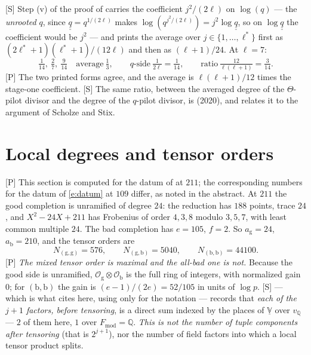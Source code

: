 \documentclass[11pt]{article}
\theoremstyle{plain}
\theoremstyle{definition}
\newcommand{\Fmod}{F_{\mathrm{mod}}}
\newcommand{\qbb}{\underline{\underline q}}
\newcommand{\VVu}{\underline{\mathbb V}}
\begin{document}
\textup{[S]} Step (v) of the proof of \cite[Thm.~1.10]{IUT4} carries the coefficient
$j^2/(2\ell)$ on $\log(q)$ --- the \emph{unrooted} $q$, since
$\qbb=q^{1/(2\ell)}$ makes $\log(q^{j^2/(2\ell)})=j^2\log\qbb$, so on $\log\qbb$ the
coefficient would be $j^2$ --- and prints the average over
$j\in\{1,\dots,\ell^{*}\}$ first as $(2\ell^{*}+1)(\ell^{*}+1)/(12\ell)$ and then as
$(\ell+1)/24$.  At $\ell=7$:
\[
 \tfrac1{14},\ \tfrac27,\ \tfrac9{14}\quad\text{average}\ \tfrac13,
 \qquad\text{$q$-side}\ \tfrac1{2\ell}=\tfrac1{14},
 \qquad\text{ratio}\ \tfrac{12}{\ell(\ell+1)}=\tfrac3{14}.
\]
\textup{[P]} The two printed forms agree, and the average is $\ell(\ell+1)/12$ times
the stage-one coefficient.  \textup{[S]} The same ratio, between the averaged degree of
the $\Theta$-pilot divisor and the degree of the $q$-pilot divisor, is
\cite[\S3.8, (3.3)]{DHPS} (2020), and \cite[Rem.~3.8.3(1)]{DHPS} relates it to the
argument of Scholze and Stix.

\section{Local degrees and tensor orders}\label{s:orders}

\textup{[P]} This section is computed for the datum of \cite{First} at $211$; the
corresponding numbers for the datum of \eqref{e:datum} at $109$ differ, as noted in the
abstract.  At $211$ the good completion is unramified of degree $24$: the reduction
has $188$ points, trace $24$, and $X^2-24X+211$ has Frobenius of order $4,3,8$ modulo
$3,5,7$, with least common multiple $24$.  The bad completion has $e=105$, $f=2$.  So
$a_{\mathrm g}=24$, $a_{\mathrm b}=210$, and the tensor orders are
\[
 N_{(\mathrm g,\mathrm g)}=576,\qquad N_{(\mathrm g,\mathrm b)}=5040,
 \qquad N_{(\mathrm b,\mathrm b)}=44100 .
\]
\textup{[P]} \emph{The mixed tensor order is maximal and the all-bad one is not.}
Because the good side is unramified, $\mathcal O_{\mathrm g}\otimes\mathcal O_{\mathrm b}$
is the full ring of integers, with normalized gain $0$; for $(\mathrm b,\mathrm b)$ the
gain is $(e-1)/(2e)=52/105$ in units of $\log p$.  \textup{[S]}
\cite[Prop.~3.2]{IUT3} --- which is what \cite[Thm.~1.10]{IUT4} cites here, using
\cite[Thm.~3.11(i)(a)]{IUT3} only for the notation --- records that \emph{each of the $j+1$
factors, before tensoring}, is a direct sum indexed by the places of $\VVu$ over
$v_{\mathbb Q}$ --- $2$ of them here, $1$ over $\Fmod=\mathbb{Q}$.  \emph{This is not
the number of tuple components after tensoring} (that is $2^{j+1}$), nor the number of
field factors into which a local tensor product splits.
\end{document}
